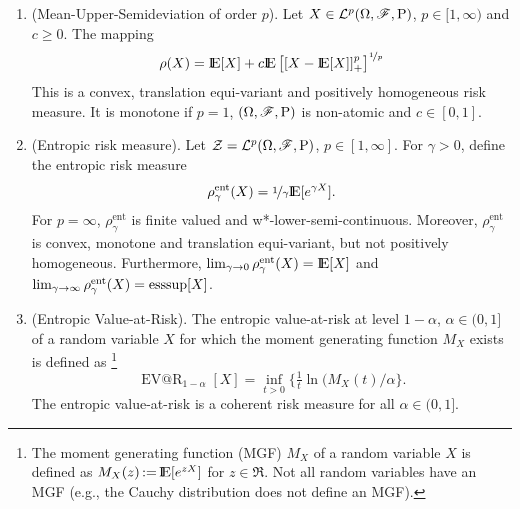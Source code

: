 \documentclass[a4paper,10pt]{scrbook}
\begin{document}
\begin{enumerate}
 \item (Mean-Upper-Semideviation of order $p$). Let $X\in\mathcal{L}^p(\Omega,\mathscr{F},\mathrm{P})$, $p\in[1,\infty)$ 
       and $c\geq 0$. The mapping
       \[
        \rho(X) = \E[X] + c \E\left[ [X-\E[X]]_+^p\right]^{\nicefrac{1}{p}}
       \]
       This is a convex, translation equi-variant and positively homogeneous risk measure.
       It is monotone if $p=1$, $(\Omega,\mathscr{F},\mathrm{P})$ is non-atomic and $c\in[0,1]$.
       
 \item (Entropic risk measure). Let $\mathcal{Z}=\mathcal{L}^p(\Omega,\mathscr{F},\mathrm{P})$, $p\in[1,\infty]$.
       For $\gamma>0$, define the entropic risk measure
       \[
        \rho^{\mathrm{ent}}_\gamma(X)= \nicefrac{1}{\gamma}\E[e^{\gamma X}].
       \]
       For $p=\infty$, $\rho^{\mathrm{ent}}_\gamma$ is finite valued and w*-lower-semi-continuous.
       Moreover, $\rho^{\mathrm{ent}}_\gamma$ is convex, monotone and translation
       equi-variant, but not positively homogeneous.
       Furthermore, $\lim_{\gamma \to 0}\rho^{\mathrm{ent}}_\gamma(X) = \E[X]$ and 
       $\lim_{\gamma \to \infty}\rho^{\mathrm{ent}}_\gamma(X) = \operatorname*{ess\!\sup}[X]$.
       
 \item (Entropic Value-at-Risk). The entropic value-at-risk at level $1-\alpha$, $\alpha\in(0,1]$ of a random 
       variable $X$ for which the moment generating function $M_X$ exists is defined as%
	  \footnote{The moment generating function (MGF) $M_X$ of a random variable $X$ is defined 
	            as $M_X(z) \dfn \E[e^{zX}]$ for $z\in\Re$. Not all random variables have an MGF 
	            (e.g., the Cauchy distribution does not define an MGF).%
	            }
       \[
        \operatorname{EV@R}_{1-\alpha}[X] = \inf_{t>0}\{\tfrac{1}{t}\ln(M_X(t)/\alpha\}.
       \]
       The entropic value-at-risk is a coherent risk measure for all $\alpha\in(0,1]$.
       

\end{enumerate}
\end{document}
